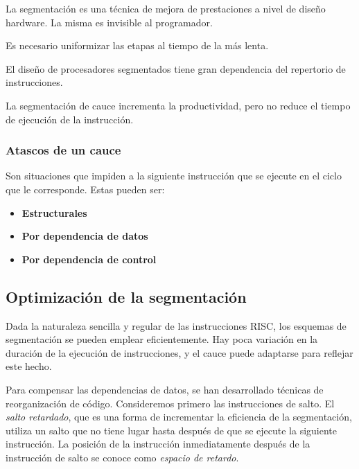 La segmentación es una técnica de mejora de prestaciones a nivel de diseño hardware. La misma es invisible al programador.

Es necesario uniformizar las etapas al tiempo de la más lenta.

El diseño de procesadores segmentados tiene gran dependencia del repertorio de instrucciones.

La segmentación de cauce incrementa la productividad, pero no reduce el tiempo de ejecución de la instrucción.

\subsubsection{Atascos de un cauce}

Son situaciones que impiden a la siguiente instrucción que se ejecute en el ciclo que le corresponde. Estas pueden ser:

\begin{itemize}
  \item \textbf{Estructurales}
  \item \textbf{Por dependencia de datos}
  \item \textbf{Por dependencia de control}
\end{itemize}

\subsection{Optimización de la segmentación}

Dada la naturaleza sencilla y regular de las instrucciones RISC, los esquemas de segmentación se pueden emplear eficientemente. Hay poca variación en la duración de la ejecución de instrucciones, y el cauce puede adaptarse para reflejar este hecho.

Para compensar las dependencias de datos, se han desarrollado técnicas de reorganización de código. Consideremos primero las instrucciones de salto. El \textit{salto retardado}, que es una forma de incrementar la eficiencia de la segmentación, utiliza un salto que no tiene lugar hasta después de que se ejecute la siguiente instrucción. La posición de la instrucción inmediatamente después de la instrucción de salto se conoce como \textit{espacio de retardo}.

